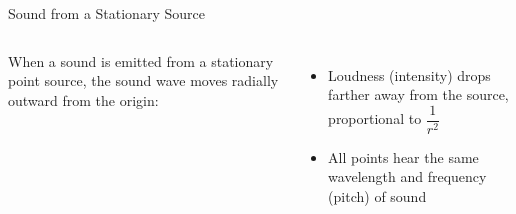 \documentclass[12pt,compress,aspectratio=169]{beamer}
\begin{document}
\begin{frame}{Sound from a Stationary Source}
  \begin{columns}

    When a sound is emitted from a stationary point source, the sound wave moves
    radially outward from the origin:
    \begin{itemize}
    \item Loudness (intensity) drops farther away from the source, proportional
      to $\dfrac1{r^2}$
    \item All points hear the same wavelength and frequency (pitch) of sound
    \end{itemize}
  \end{columns}
\end{frame}
\end{document}
